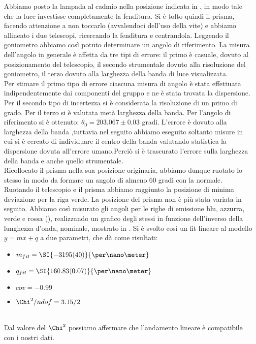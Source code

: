 Abbiamo posto la lampada al cadmio nella posizione indicata in , in modo tale che la luce investisse completamente la fenditura. Si è tolto quindi il prisma, facendo attenzione a non toccarlo (avvalendoci dell'uso della vite) e abbiamo allineato i due telescopi, ricercando la fenditura e centrandola. Leggendo il goniometro abbiamo così potuto determinare un angolo di riferimento. La misura dell'angolo in generale è affetta da tre tipi di errore: il primo è casuale, dovuto al posizionamento del telescopio, il secondo strumentale dovuto alla  risoluzione del goniometro, il terzo dovuto alla larghezza della banda di luce visualizzata. \\
Per stimare il primo tipo di errore ciascuna misura di angolo è stata effettuata indipendentemente dai componenti del gruppo e ne è stata trovata la dispersione. Per il secondo tipo di incertezza si è considerata la risoluzione di un primo di grado. Per il terzo si è valutata metà larghezza della banda. Per l'angolo di riferimento si è ottenuto: $\theta_{0}=203.067 \pm 0.03$ gradi. L'errore è dovuto alla larghezza della banda ,tuttavia nel seguito abbiamo eseguito soltanto misure in cui si è cercato di individuare il centro della banda valutando statistica la dispersione dovuta all'errore umano.Perciò si è trascurato l'errore sulla larghezza della banda e anche quello strumentale.\\
 
Ricollocato il prisma nella sua posizione originaria, abbiamo dunque ruotato lo stesso in modo da formare un angolo di almeno 60 gradi con la normale. Ruotando il telescopio e il prisma abbiamo raggiunto la posizione di minima deviazione per la riga verde. La posizione del prisma non è più stata variata in seguito. Abbiamo così misurato gli angoli per le righe di emissione blu, azzurra, verde e rossa (), realizzando un grafico degli stessi in funzione dell'inverso della lunghezza d'onda, nominale, mostrato in . Si è svolto così un fit lineare al modello $y=mx+q$ a due parametri, che dà come risultati:	
\begin{itemize}
\item	$m_{fit}=	\SI{-3195 (40)}{\per\nano\meter}$
\item	$q_{fit}=	\SI{160.83 (0.07)}{\per\nano\meter}$
\item	$cov=-0.99$
\item	$\Chi^2/ndof=3.15/2$
\end{itemize}
\\
Dal valore del $\Chi^{2}$ possiamo affermare che l'andamento lineare è compatibile con i nostri dati.



